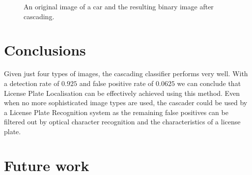 \documentclass[a4paper,11pt]{article}
\begin{document}
\begin{figure}[!ht]
\centering
{}
\caption{An original image of a car and the resulting binary image after cascading.}
\label{fig:cascader}
\end{figure}

\section{Conclusions} \label{sec:conc}
Given just four types of images, the cascading classifier performs very well.
With a detection rate of $0.925$ and false positive rate of $0.0625$ we can
conclude that License Plate Localisation can be effectively achieved using this
method. Even when no more sophisticated image types are used, the cascader
could be used by a License Plate Recognition system as the remaining false
positives can be filtered out by optical character recognition and the
characteristics of a license plate.

\section{Future work} \label{sec:conc}
\end{document}
